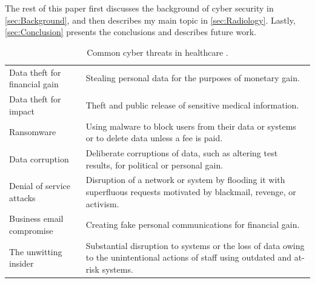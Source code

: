 \documentclass[pdf,bookmarks,colorlinks=true]{IEEEtran}
\begin{document}
The rest of this paper first discusses the background of cyber security in
\ref{sec:Background}, and then describes my main topic in
\ref{sec:Radiology}. Lastly, \ref{sec:Conclusion} presents the
conclusions and describes future work.

\begin{table}[tbh]
	\caption{Common cyber threats in healthcare \cite{martin2017cybersecurity}.}
	\centering
	\begin{tabular}{l l}
		\hline\hline
	Data theft for financial gain & Stealing personal data for the purposes of monetary gain. \\
	Data theft for impact & Theft and public release of sensitive medical information. \\
	Ransomware & Using malware to block users from their data or systems or to delete data unless a fee is paid. \\
	Data corruption & Deliberate corruptions of data, such as altering test results, for political or personal gain. \\
	Denial of service attacks & Disruption of a network or system by flooding it with superfluous requests motivated by blackmail, revenge, or activism. \\
	Business email compromise & Creating fake personal communications for financial gain.\\ 
	The unwitting insider & Substantial disruption to systems or the loss of data owing to the unintentional actions of staff using outdated and at-risk systems. \\
	\hline
	\end{tabular}
	\label{tab:common}
\end{table}
\end{document}
